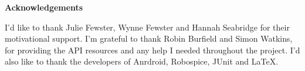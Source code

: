 \thispagestyle{empty}

\begin{center}
    {\LARGE\bf Acknowledgements}
\end{center}
I'd like to thank Julie Fewster, Wynne Fewster and Hannah Seabridge for their motivational support. I'm grateful to thank Robin Burfield and Simon Watkins, for providing the API resources and any help I needed throughout the project. I'd also like to thank the developers of Anrdroid, Robospice, JUnit and LaTeX.